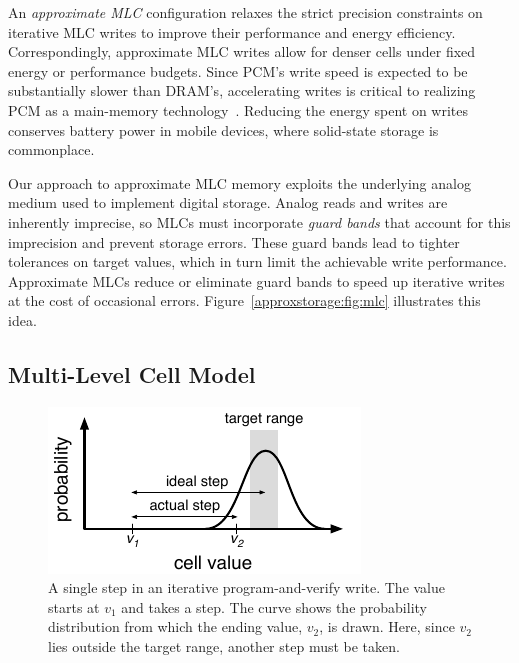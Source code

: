 An \emph{approximate MLC} configuration relaxes the strict precision
constraints on iterative MLC writes to improve their performance and energy
efficiency. Correspondingly, approximate MLC writes allow for denser cells
under fixed energy or performance budgets. Since PCM's write speed is expected
to be substantially slower than DRAM's, accelerating writes is critical to
realizing PCM as a main-memory technology~\cite{pcm-dram-alt}.
Reducing the energy
spent on writes conserves battery power in mobile devices, where
solid-state storage is commonplace.

Our approach to approximate MLC memory exploits the underlying
analog medium used to implement digital storage. Analog reads and
writes are inherently imprecise, so MLCs must incorporate \emph{guard
bands} that account for this imprecision and prevent storage errors.
These guard bands lead to tighter tolerances on target values, which in turn limit
the achievable write performance.
Approximate MLCs reduce or eliminate guard bands to speed up
iterative writes at the cost of occasional errors.
Figure~\ref{approxstorage:fig:mlc} illustrates this idea.

\subsection{Multi-Level Cell Model}
\label{approxstorage:sec:mlcmodel}

\begin{figure}
    \centering
    \includegraphics[scale=1.1]{figs/mlc-step}
    \caption{
        A single step in an iterative program-and-verify write. The value
        starts at $v_1$ and takes a step. The curve shows the probability
        distribution from which the ending value, $v_2$, is drawn. Here, since
        $v_2$ lies outside the target range, another step must be taken.
    }
    \label{approxstorage:fig:mlc-step}
\end{figure}

